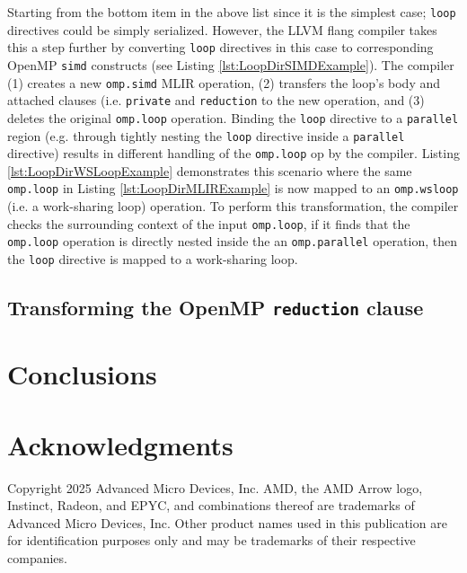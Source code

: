 \documentclass[acmtog,natbib=false]{acmart}
\newcommand{\code}[1]{\texttt{#1}\xspace}
\begin{document}
Starting from the bottom item in the above list since it is the simplest case; \code{loop} directives could be simply serialized.
However, the LLVM flang compiler takes this a step further by converting \code{loop} directives in this case to corresponding OpenMP \code{simd} constructs (see Listing \ref{lst:LoopDirSIMDExample}).
The compiler (1) creates a new \code{omp.simd} MLIR operation, (2) transfers the loop's body and attached clauses (i.e. \code{private} and \code{reduction} to the new operation, and (3) deletes the original \code{omp.loop} operation. Binding the \code{loop} directive to a \code{parallel} region (e.g. through tightly nesting the \code{loop} directive inside a \code{parallel} directive) results in different handling of the \code{omp.loop} op by the compiler.
Listing \ref{lst:LoopDirWSLoopExample} demonstrates this scenario where the same \code{omp.loop} in Listing \ref{lst:LoopDirMLIRExample} is now mapped to an \code{omp.wsloop} (i.e. a work-sharing loop) operation.
To perform this transformation, the compiler checks the surrounding context of the input \code{omp.loop}, if it finds that the \code{omp.loop} operation is directly nested inside the an \code{omp.parallel} operation, then the \code{loop} directive is mapped to a work-sharing loop.

\subsection{Transforming the OpenMP \code{reduction} clause}
\label{sec:OpenMPReduction}


\section{Conclusions}
\label{sec:Conclusions}





\section*{Acknowledgments}
Copyright 2025 Advanced Micro Devices, Inc.
AMD, the AMD Arrow logo, Instinct, Radeon, and EPYC, and combinations thereof are trademarks of Advanced Micro Devices, Inc.
Other product names used in this publication are for identification purposes only and may be trademarks of their respective companies.

\printbibliography
\end{document}
